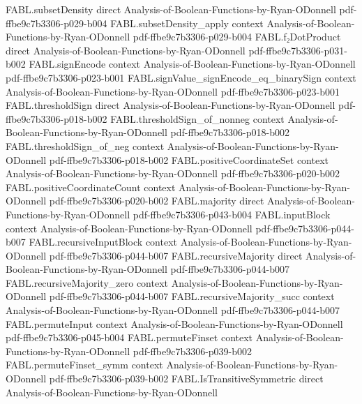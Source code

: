 \begin{theorem}
  {FABL.subsetDensity}
  {direct}
  {Analysis-of-Boolean-Functions-by-Ryan-ODonnell}
  {pdf-ffbe9c7b3306-p029-b004}
\proofstep
  {FABL.subsetDensity_apply}
  {context}
  {Analysis-of-Boolean-Functions-by-Ryan-ODonnell}
  {pdf-ffbe9c7b3306-p029-b004}
\proofstep
  {FABL.f₂DotProduct}
  {direct}
  {Analysis-of-Boolean-Functions-by-Ryan-ODonnell}
  {pdf-ffbe9c7b3306-p031-b002}
\proofstep
  {FABL.signEncode}
  {context}
  {Analysis-of-Boolean-Functions-by-Ryan-ODonnell}
  {pdf-ffbe9c7b3306-p023-b001}
\proofstep
  {FABL.signValue_signEncode_eq_binarySign}
  {context}
  {Analysis-of-Boolean-Functions-by-Ryan-ODonnell}
  {pdf-ffbe9c7b3306-p023-b001}
\proofstep
  {FABL.thresholdSign}
  {direct}
  {Analysis-of-Boolean-Functions-by-Ryan-ODonnell}
  {pdf-ffbe9c7b3306-p018-b002}
\proofstep
  {FABL.thresholdSign_of_nonneg}
  {context}
  {Analysis-of-Boolean-Functions-by-Ryan-ODonnell}
  {pdf-ffbe9c7b3306-p018-b002}
\proofstep
  {FABL.thresholdSign_of_neg}
  {context}
  {Analysis-of-Boolean-Functions-by-Ryan-ODonnell}
  {pdf-ffbe9c7b3306-p018-b002}
\proofstep
  {FABL.positiveCoordinateSet}
  {context}
  {Analysis-of-Boolean-Functions-by-Ryan-ODonnell}
  {pdf-ffbe9c7b3306-p020-b002}
\proofstep
  {FABL.positiveCoordinateCount}
  {context}
  {Analysis-of-Boolean-Functions-by-Ryan-ODonnell}
  {pdf-ffbe9c7b3306-p020-b002}
\proofstep
  {FABL.majority}
  {direct}
  {Analysis-of-Boolean-Functions-by-Ryan-ODonnell}
  {pdf-ffbe9c7b3306-p043-b004}
\proofstep
  {FABL.inputBlock}
  {context}
  {Analysis-of-Boolean-Functions-by-Ryan-ODonnell}
  {pdf-ffbe9c7b3306-p044-b007}
\proofstep
  {FABL.recursiveInputBlock}
  {context}
  {Analysis-of-Boolean-Functions-by-Ryan-ODonnell}
  {pdf-ffbe9c7b3306-p044-b007}
\proofstep
  {FABL.recursiveMajority}
  {direct}
  {Analysis-of-Boolean-Functions-by-Ryan-ODonnell}
  {pdf-ffbe9c7b3306-p044-b007}
\proofstep
  {FABL.recursiveMajority_zero}
  {context}
  {Analysis-of-Boolean-Functions-by-Ryan-ODonnell}
  {pdf-ffbe9c7b3306-p044-b007}
\proofstep
  {FABL.recursiveMajority_succ}
  {context}
  {Analysis-of-Boolean-Functions-by-Ryan-ODonnell}
  {pdf-ffbe9c7b3306-p044-b007}
\proofstep
  {FABL.permuteInput}
  {context}
  {Analysis-of-Boolean-Functions-by-Ryan-ODonnell}
  {pdf-ffbe9c7b3306-p045-b004}
\proofstep
  {FABL.permuteFinset}
  {context}
  {Analysis-of-Boolean-Functions-by-Ryan-ODonnell}
  {pdf-ffbe9c7b3306-p039-b002}
\proofstep
  {FABL.permuteFinset_symm}
  {context}
  {Analysis-of-Boolean-Functions-by-Ryan-ODonnell}
  {pdf-ffbe9c7b3306-p039-b002}
\proofstep
  {FABL.IsTransitiveSymmetric}
  {direct}
  {Analysis-of-Boolean-Functions-by-Ryan-ODonnell}

\end{theorem}
